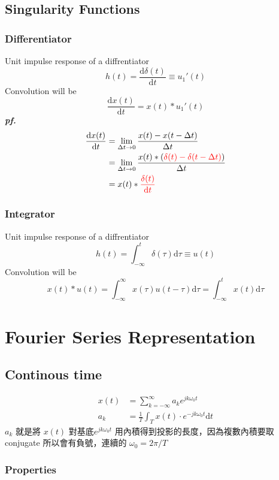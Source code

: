 \documentclass[12pt, a4paper]{article}
\begin{document}
\subsection*{Singularity Functions}
\subsubsection*{Differentiator}
Unit impulse response of a diffrentiator
$$
h(t) = \frac{\text{d}\delta(t)}{\text{d}t} \equiv u_1'(t)
$$
Convolution will be 
$$
\frac{\text{d}x(t)}{\text{d}t}= x(t)*u_1'(t)
$$
\textbf{\textit{pf.}}
\begin{align*}
	\frac{\text{d}x(t)}{\text{d}t} &= \lim_{\Delta t \to 0} \frac{x(t)-x(t-\Delta t)}{\Delta t} \\
																 &= \lim_{\Delta t \to 0} \frac{x(t)*(\color{red}\delta(t)-\delta(t-\Delta t)\color{black})}{\Delta t} \\
																 &= x(t) * \color{red} \frac{\delta(t)}{\text{d}t} \color{black}
\end{align*}

\subsubsection*{Integrator}
Unit impulse response of a diffrentiator
$$
h(t) = \int_{-\infty}^{t}\delta(\tau)\text{d}\tau \equiv u(t)
$$
Convolution will be 
$$
x(t)*u(t) = \int_{-\infty}^{\infty}x(\tau)u(t-\tau)\text{d}\tau = \int_{-\infty}^{t}x(t)\text{d}\tau
$$
\newpage

\section*{Fourier Series Representation}
\subsection*{Continous time}
\begin{align*}
	x(t) &= \sum_{k=-\infty}^{\infty}a_ke^{jk\omega_0t}\\
	a_k &= \frac{1}{T} \int_T x(t) \cdot e^{-jk\omega_0t} \text{d}t
\end{align*}
$a_k$ 就是將 $x(t)$ 對基底$e^{jk\omega_0t}$ 用內積得到投影的長度，因為複數內積要取 conjugate 所以會有負號，連續的 $\omega_0 = 2\pi / T$
\subsubsection*{Properties}
\end{document}
